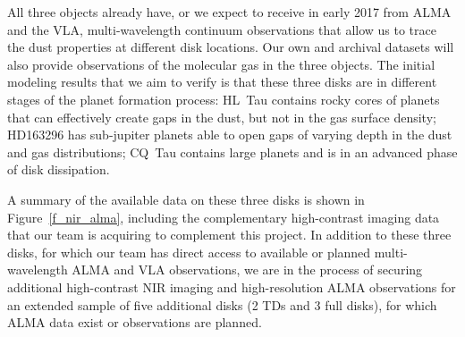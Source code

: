 \documentclass[10pt,fleqn,twoside]{article}
\begin{document}
All three objects already have, or we expect to receive in early 2017 from ALMA and the VLA, multi-wavelength continuum observations that allow us to trace the dust properties at different disk locations. Our own and archival datasets will also provide observations of the molecular gas in the three objects.
The initial modeling results that we aim to verify is that these three disks are in different stages of the planet formation process: HL~Tau contains rocky cores of planets that can effectively create gaps in the dust, but not in the gas surface density; HD163296 has sub-jupiter planets able to open gaps of varying depth in the dust and gas distributions; CQ~Tau contains large planets and is in an advanced phase of disk dissipation.

A summary of the available data on these three disks is shown in Figure~\ref{f_nir_alma}, including the complementary high-contrast imaging data that our team is acquiring to complement this project. In addition to these three disks, for which our team has direct access to available or planned multi-wavelength ALMA and VLA observations, we are in the process of securing additional high-contrast NIR imaging and high-resolution ALMA observations for an extended sample of five additional disks (2 TDs and 3 full disks), for which ALMA data exist or observations are planned.
\end{document}

